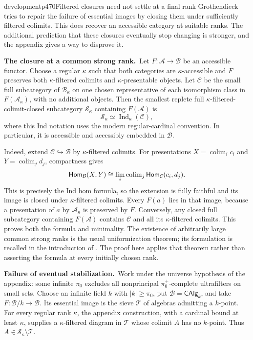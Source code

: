 \begin{dcomment}{development}{p470}{Filtered closures need not settle at a final rank}
Grothendieck tries to repair the failure of essential images by closing them under sufficiently filtered colimits. This does recover an accessible category at suitable ranks. The additional prediction that these closures eventually stop changing is stronger, and the appendix gives a way to disprove it.

\textbf{The closure at a common strong rank.}\ours\
Let $F:\mathcal A\to\mathcal B$ be an accessible functor. Choose a regular $\kappa$ such that both categories are $\kappa$-accessible and $F$ preserves both $\kappa$-filtered colimits and $\kappa$-presentable objects. Let $\mathcal C$ be the small full subcategory of $\mathcal B_\kappa$ on one chosen representative of each isomorphism class in $F(\mathcal A_\kappa)$, with no additional objects. Then the smallest replete full $\kappa$-filtered-colimit-closed subcategory $\mathcal S_\kappa$ containing $F(\mathcal A)$ is
\[
 \mathcal S_\kappa\simeq\operatorname{Ind}_\kappa(\mathcal C),
\]
where this Ind notation uses the modern regular-cardinal convention. In particular, it is accessible and accessibly embedded in $\mathcal B$.

Indeed, extend $\mathcal C\hookrightarrow\mathcal B$ by $\kappa$-filtered colimits. For presentations $X=\operatorname{colim}_i c_i$ and $Y=\operatorname{colim}_j d_j$, compactness gives
\[
 \mathsf{Hom}_{\mathcal B}(X,Y)
 \cong\lim_i\operatorname{colim}_j\mathsf{Hom}_{\mathcal C}(c_i,d_j).
\]
This is precisely the Ind hom formula, so the extension is fully faithful and its image is closed under $\kappa$-filtered colimits. Every $F(a)$ lies in that image, because a presentation of $a$ by $\mathcal A_\kappa$ is preserved by $F$. Conversely, any closed full subcategory containing $F(\mathcal A)$ contains $\mathcal C$ and all its $\kappa$-filtered colimits. This proves both the formula and minimality. The existence of arbitrarily large common strong ranks is the usual uniformization theorem; its formulation is recalled in the introduction of \citet{PareRosicky2013}. The proof here applies that theorem rather than asserting the formula at every initially chosen rank.

\textbf{Failure of eventual stabilization.}\ours\
Work under the universe hypothesis of the appendix: some infinite $\pi_0$ excludes all nonprincipal $\pi_0^+$-complete ultrafilters on small sets. Choose an infinite field $k$ with $|k|\ge\pi_0$, put $\mathcal B=\mathsf{CAlg}_k$, and take $F:\mathcal B/k\to\mathcal B$. Its essential image is the sieve $\mathcal T$ of algebras admitting a $k$-point. For every regular rank $\kappa$, the appendix construction, with a cardinal bound at least $\kappa$, supplies a $\kappa$-filtered diagram in $\mathcal T$ whose colimit $A$ has no $k$-point. Thus $A\in\mathcal S_\kappa\setminus\mathcal T$.


\end{dcomment}
